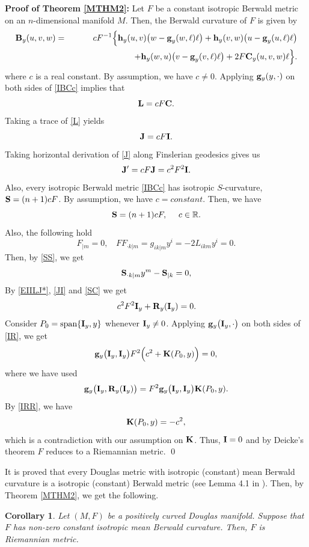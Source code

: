\documentclass[12pt,a4paper]{article}
\newtheorem{cor}{Corollary}[section]
\theoremstyle{definition}
\newcommand{\be}{\begin{equation}}
\newcommand{\ee}{\end{equation}}
\numberwithin{equation}{section}
\begin{document}
\bigskip
\noindent
{\bf Proof of Theorem \ref{MTHM2}:} Let $F$ be a constant isotropic Berwald   metric on an $n$-dimensional manifold $M$. Then, the Berwald curvature of $F$ is given by
\begin{eqnarray}\label{IBCc}
\nonumber{\bf B}_y(u,v,w)&=& c F^{-1}\Big\{{\bf h}_y(u,v)\big (w-\textbf{g}_y(w,\ell)\ell\big)+{\bf h}_y(v, w)\big(u-\textbf{g}_y(u,\ell)\ell\big)
\\ &&\quad\quad \ \ \ \ \ \ \ \ \  \ \ \ \ \ \ \ +{\bf h}_y(w, u)\big(v-\textbf{g}_y(v,\ell)\ell\big)+2F{\bf C}_y(u, v, w) \ell\Big\}.
\end{eqnarray}
where $c$ is a real constant.  By assumption, we have $c\neq 0$. Applying  ${\bf g}_y(y,\cdot)$ on both sides of \eqref{IBCc}   implies that
\be
{\bf L}=c F {\bf C}.\label{L}
\ee
Taking a trace of  \eqref{L} yields
\be
{\bf J}=c F {\bf I}.\label{J}
\ee
Taking horizontal derivation of \eqref{J} along Finslerian geodesics gives us
\be
{\bf J}'=cF{\bf J}=c^2F^2 {\bf I}.\label{JI}
\ee
Also, every isotropic Berwald   metric \eqref{IBCc} has isotropic $S$-curvature, ${\bf S}=(n+1)c F$.  By assumption, we have $c=constant$. Then, we have
\be
{\bf S}=(n+1)c F,   \ \ \ \ c\in \mathbb{R}.\label{SS}
\ee
Also, the following hold
\[
F_{|m}=0, \ \ \ \ FF_{\cdot k |m}=g_{ik|m}y^i=-2L_{ikm}y^i=0.
\]
Then, by \eqref{SS},  we get
\be
{\bf S}_{\cdot k|m}y^m - {\bf S}_{|k}=0, \label{SC}
\ee
By  \eqref{EIILJ*}, \eqref{JI} and \eqref{SC} we get
\be
c^2F^2{\bf I}_y+  {\bf R}_y({\bf I}_y) = 0. \label{IR}
\ee
Consider $P_0= {\rm span} \{{\bf I}_y, y\}$ whenever ${\bf I}_y \not=0$. Applying ${\bf g}_y \big({\bf I}_y, \cdot\big)$ on both sides of  \eqref{IR}, we get
\be
{\bf g}_y \big({\bf I}_y, {\bf I}_y\big)F^2\Big (c^2+  {\bf K}(P_0, y) \Big )= 0, \label{IRR}
\ee
where we have used
\[
{\bf g}_y \big({\bf I}_y, {\bf R}_y({\bf I}_y)\big)=F^2{\bf g}_y \big({\bf I}_y, {\bf I}_y\big){\bf K}(P_0, y).
\]
By \eqref{IRR}, we have
\be
 {\bf K}(P_0, y) = -c^2, \label{IRRR}
\ee
which is a contradiction with our assumption on ${\bf {K}}$. Thus, ${\bf I}=0$ and by  Deicke's theorem $F$ reduces to a  Riemannian metric.
\qed

\bigskip

It is proved that every Douglas metric with isotropic (constant) mean Berwald curvature  is a isotropic (constant) Berwald metric (see Lemma 4.1 in \cite{CS}). Then, by Theorem \ref{MTHM2}, we get the following.
\begin{cor}
Let $(M, F)$ be a positively curved Douglas manifold. Suppose that $F$ has  non-zero constant isotropic mean Berwald curvature. Then, $F$ is Riemannian metric.
\end{cor}
\end{document}
